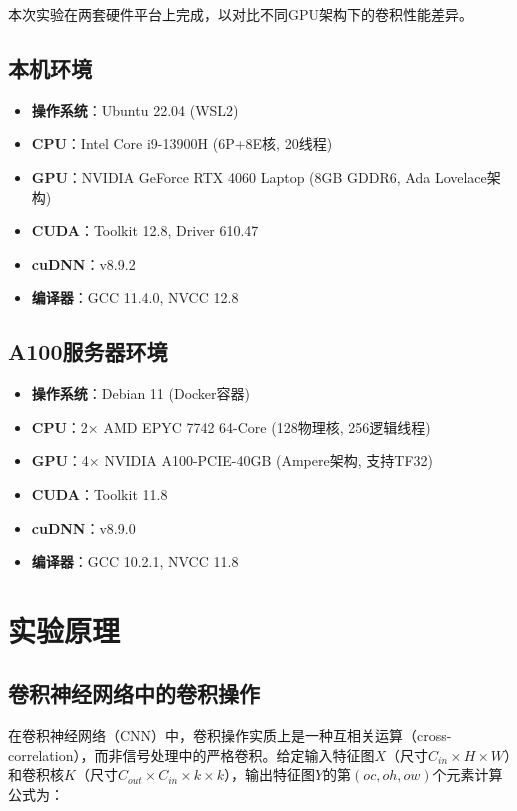 \documentclass[a4paper]{article}
\begin{document}
本次实验在两套硬件平台上完成，以对比不同GPU架构下的卷积性能差异。

\subsection{本机环境}

\begin{itemize}
    \item \textbf{操作系统}：Ubuntu 22.04 (WSL2)
    \item \textbf{CPU}：Intel Core i9-13900H (6P+8E核, 20线程)
    \item \textbf{GPU}：NVIDIA GeForce RTX 4060 Laptop (8GB GDDR6, Ada Lovelace架构)
    \item \textbf{CUDA}：Toolkit 12.8, Driver 610.47
    \item \textbf{cuDNN}：v8.9.2
    \item \textbf{编译器}：GCC 11.4.0, NVCC 12.8
\end{itemize}

\subsection{A100服务器环境}

\begin{itemize}
    \item \textbf{操作系统}：Debian 11 (Docker容器)
    \item \textbf{CPU}：2$\times$ AMD EPYC 7742 64-Core (128物理核, 256逻辑线程)
    \item \textbf{GPU}：4$\times$ NVIDIA A100-PCIE-40GB (Ampere架构, 支持TF32)
    \item \textbf{CUDA}：Toolkit 11.8
    \item \textbf{cuDNN}：v8.9.0
    \item \textbf{编译器}：GCC 10.2.1, NVCC 11.8
\end{itemize}

\section{实验原理}

\subsection{卷积神经网络中的卷积操作}

在卷积神经网络（CNN）中，卷积操作实质上是一种互相关运算（cross-correlation），而非信号处理中的严格卷积\cite{cs231n_conv_nets}。给定输入特征图$X$（尺寸$C_{in}\times H\times W$）和卷积核$K$（尺寸$C_{out}\times C_{in}\times k\times k$），输出特征图$Y$的第$(oc, oh, ow)$个元素计算公式为：
\end{document}
